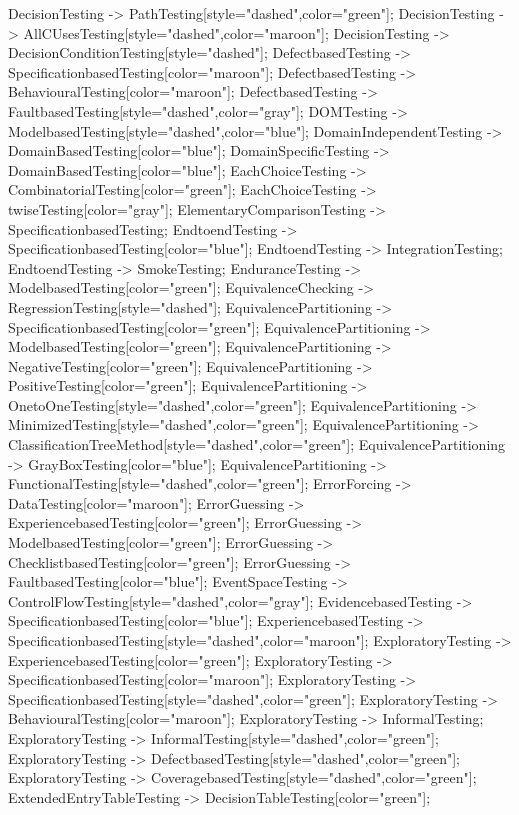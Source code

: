 \documentclass{article}
\begin{document}
{DecisionTesting -> PathTesting[style="dashed",color="green"];
DecisionTesting -> AllCUsesTesting[style="dashed",color="maroon"];
DecisionTesting -> DecisionConditionTesting[style="dashed"];
DefectbasedTesting -> SpecificationbasedTesting[color="maroon"];
DefectbasedTesting -> BehaviouralTesting[color="maroon"];
DefectbasedTesting -> FaultbasedTesting[style="dashed",color="gray"];
DOMTesting -> ModelbasedTesting[style="dashed",color="blue"];
DomainIndependentTesting -> DomainBasedTesting[color="blue"];
DomainSpecificTesting -> DomainBasedTesting[color="blue"];
EachChoiceTesting -> CombinatorialTesting[color="green"];
EachChoiceTesting -> twiseTesting[color="gray"];
ElementaryComparisonTesting -> SpecificationbasedTesting;
EndtoendTesting -> SpecificationbasedTesting[color="blue"];
EndtoendTesting -> IntegrationTesting;
EndtoendTesting -> SmokeTesting;
EnduranceTesting -> ModelbasedTesting[color="green"];
EquivalenceChecking -> RegressionTesting[style="dashed"];
EquivalencePartitioning -> SpecificationbasedTesting[color="green"];
EquivalencePartitioning -> ModelbasedTesting[color="green"];
EquivalencePartitioning -> NegativeTesting[color="green"];
EquivalencePartitioning -> PositiveTesting[color="green"];
EquivalencePartitioning -> OnetoOneTesting[style="dashed",color="green"];
EquivalencePartitioning -> MinimizedTesting[style="dashed",color="green"];
EquivalencePartitioning -> ClassificationTreeMethod[style="dashed",color="green"];
EquivalencePartitioning -> GrayBoxTesting[color="blue"];
EquivalencePartitioning -> FunctionalTesting[style="dashed",color="green"];
ErrorForcing -> DataTesting[color="maroon"];
ErrorGuessing -> ExperiencebasedTesting[color="green"];
ErrorGuessing -> ModelbasedTesting[color="green"];
ErrorGuessing -> ChecklistbasedTesting[color="green"];
ErrorGuessing -> FaultbasedTesting[color="blue"];
EventSpaceTesting -> ControlFlowTesting[style="dashed",color="gray"];
EvidencebasedTesting -> SpecificationbasedTesting[color="blue"];
ExperiencebasedTesting -> SpecificationbasedTesting[style="dashed",color="maroon"];
ExploratoryTesting -> ExperiencebasedTesting[color="green"];
ExploratoryTesting -> SpecificationbasedTesting[color="maroon"];
ExploratoryTesting -> SpecificationbasedTesting[style="dashed",color="green"];
ExploratoryTesting -> BehaviouralTesting[color="maroon"];
ExploratoryTesting -> InformalTesting;
ExploratoryTesting -> InformalTesting[style="dashed",color="green"];
ExploratoryTesting -> DefectbasedTesting[style="dashed",color="green"];
ExploratoryTesting -> CoveragebasedTesting[style="dashed",color="green"];
ExtendedEntryTableTesting -> DecisionTableTesting[color="green"];
}
\end{document}
